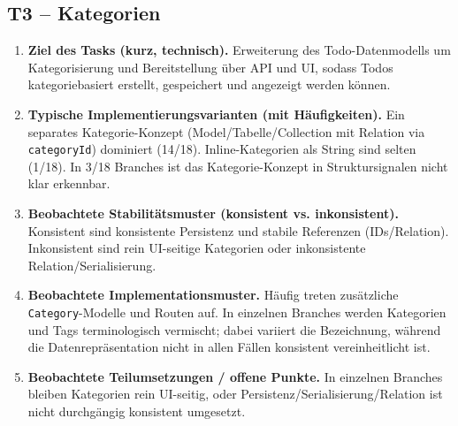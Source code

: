 \subsection*{T3 -- Kategorien}
\begin{enumerate}
  \item  \textbf{Ziel des Tasks (kurz, technisch).} Erweiterung des Todo-Datenmodells um Kategorisierung und Bereitstellung über API und UI, sodass Todos kategoriebasiert erstellt, gespeichert und angezeigt werden können.

  \item  \textbf{Typische Implementierungsvarianten (mit Häufigkeiten).} Ein separates Kategorie-Konzept (Model/Tabelle/Collection mit Relation via \texttt{categoryId}) dominiert (14/18). Inline-Kategorien als String sind selten (1/18). In 3/18 Branches ist das Kategorie-Konzept in Struktursignalen nicht klar erkennbar.

  \item  \textbf{Beobachtete Stabilitätsmuster (konsistent vs. inkonsistent).} Konsistent sind konsistente Persistenz und stabile Referenzen (IDs/Relation). Inkonsistent sind rein UI-seitige Kategorien oder inkonsistente Relation/Serialisierung.

  \item  \textbf{Beobachtete Implementationsmuster.} Häufig treten zusätzliche \texttt{Category}-Modelle und Routen auf. In einzelnen Branches werden Kategorien und Tags terminologisch vermischt; dabei variiert die Bezeichnung, während die Datenrepräsentation nicht in allen Fällen konsistent vereinheitlicht ist.

  \item  \textbf{Beobachtete Teilumsetzungen / offene Punkte.} In einzelnen Branches bleiben Kategorien rein UI-seitig, oder Persistenz/Serialisierung/Relation ist nicht durchgängig konsistent umgesetzt.
\end{enumerate}

